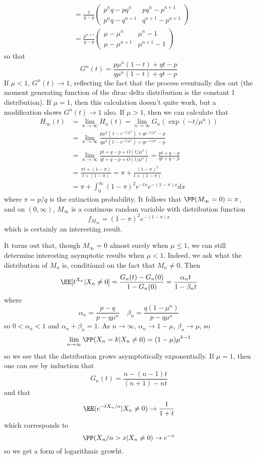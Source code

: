 \begin{example}
\begin{align*}
        &= \frac{1}{q - p} \begin{pmatrix} p^nq - pq^n & pq^n -p^{n+1} \\ p^nq - q^{n+1} & q^{n+1} - p^{n+1} \end{pmatrix}\\
        &= \frac{p^{n+1}}{q - p} \begin{pmatrix} \mu - \mu^n & \mu^n - 1 \\ \mu - \mu^{n+1} & \mu^{n+1} - 1 \end{pmatrix}
    \end{align*}
    so that
    \[ G^n(t) = \frac{p\mu^n(1 - t) + qt - p}{q \mu^n(1 - t) + qt - p} \]
    If $\mu < 1$, $G^n(t) \to 1$, reflecting the fact that the process eventually dies out (the moment generating function of the dirac delta distribution is the constant 1 distribution). If $\mu = 1$, then this calculation doesn't quite work, but a modification shows $G^n(t) \to 1$ also. If $\mu > 1$, then we can calculate that
    \begin{align*}
        H_\infty(t) &= \lim_{n \to \infty} H_n(t) = \lim_{n \to \infty} G_n(\exp(-t/\mu^n))\\
        &= \lim_{n \to \infty} \frac{p\mu^n(1 - e^{-t/\mu^n}) + qe^{-t/\mu^n} - p}{q\mu^n(1 - e^{-t/\mu^n}) + qe^{-t/\mu^n} - p}\\
        &= \lim_{n \to \infty} \frac{pt + q - p + O(t/\mu^{n})}{qt + q - p + O(t/\mu^{n})} = \frac{pt + q - p}{qt + q - p}\\
        &= \frac{\pi t + (1 - \pi)}{t + (1 - \pi)} = \pi + \frac{(1 - \pi)^2}{t + (1 - \pi)}\\
        &= \pi + \int_0^\infty (1 - \pi)^2 e^{-tx}e^{-(1 - \pi)x} dx
    \end{align*}
    where $\pi = p/q$ is the extinction probability. It follows that $\PP(M_\infty = 0) = \pi$, and on $(0,\infty)$, $M_\infty$ is a continous random variable with distribution function
    \[ f_{M_\infty} = (1 - \pi)^2 e^{-(1 - \pi)x} \]
    which is certainly an interesting result.

    It turns out that, though $M_\infty = 0$ almost surely when $\mu \leq 1$, we can still determine interesting asymptotic results when $\mu < 1$. Indeed, we ask what the distribution of $M_n$ is, conditional on the fact that $M_n \neq 0$. Then
    \[ \EE[t^{X_n}|X_n \neq 0] = \frac{G_n(t) - G_n(0)}{1 - G_n(0)} = \frac{\alpha_n t}{1 - \beta_n t} \]
    where
    \[ \alpha_n = \frac{p-q}{p-q\mu^n}\ \ \ \ \ \beta_n = \frac{q(1 - \mu^n)}{p - q\mu^n} \]
    so $0 < \alpha_n < 1$ and $\alpha_n + \beta_n = 1$. As $n \to \infty$, $\alpha_n \to 1 - \mu$, $\beta_n \to \mu$, so
    \[ \lim_{n \to \infty} \PP(X_n = k|X_n \neq 0) = (1 - \mu) \mu^{k-1} \]
    so we see that the distribution grows asymptotically exponentially. If $\mu = 1$, then one can see by induction that
    \[ G_n(t) = \frac{n - (n-1)t}{(n + 1) - nt} \]
    and that
    \[ \EE(e^{-tX_n/n}|X_n \neq 0) \to \frac{1}{1 + t} \]
    which corresponds to
    \[ \PP(X_n/n > x | X_n \neq 0) \to e^{-x} \]
    so we get a form of logarithmic growht.
\end{example}

